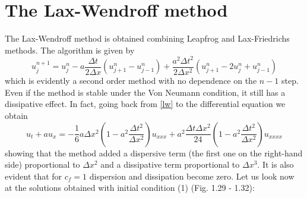 \documentclass[11pt,a4paper]{article}
\begin{document}
\section{The Lax-Wendroff method}
The Lax-Wendroff method is obtained combining Leapfrog and Lax-Friedrichs methods. The algorithm is given by
\begin{equation}\label{lw}
u_j^{n+1}= u_j^n - a\frac{\Delta t}{2 \Delta x} (u_{j+1}^n - u_{j-1}^n) + \frac{a^2 \Delta t^2}{2 \Delta x^2}(u_{j+1}^n - 2u_j^n + u_{j-1}^n)
\end{equation} 
which is evidently a second order method with no dependence on the $n-1$ step. Even if the method is stable under the Von Neumann condition, it still has a dissipative effect. In fact, going back from \eqref{lw} to the differential equation we obtain
\begin{equation}
u_t + a u_x = -\frac{1}{6}a\Delta x^2 \left( 1- a^2 \frac{\Delta t^2}{\Delta x^2} \right)u_{xxx} + a^2 \frac{\Delta t \Delta x^2}{24} \left( 1- a^2 \frac{\Delta t^2}{\Delta x^2} \right)u_{xxxx}
\end{equation}
showing that the method added a dispersive term (the first one on the right-hand side) proportional to $\Delta x^2$ and a dissipative term proportional to $\Delta x^3$. It is also evident that for $c_f=1$  dispersion and dissipation become zero. Let us look now at the solutions obtained with initial condition (1) (Fig. 1.29 - 1.32):
\end{document}
